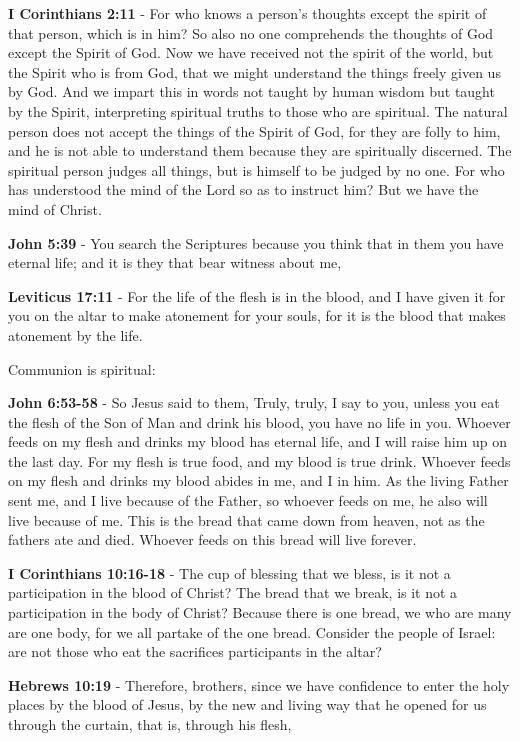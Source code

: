 \documentclass[11pt]{article}
\begin{document}
\textbf{I Corinthians 2:11} - For who knows a person's thoughts except the spirit of that person, which is in him? So also no one comprehends the thoughts of God except the Spirit of God. Now we have received not the spirit of the world, but the Spirit who is from God, that we might understand the things freely given us by God. And we impart this in words not taught by human wisdom but taught by the Spirit, interpreting spiritual truths to those who are spiritual. The natural person does not accept the things of the Spirit of God, for they are folly to him, and he is not able to understand them because they are spiritually discerned. The spiritual person judges all things, but is himself to be judged by no one. For who has understood the mind of the Lord so as to instruct him? But we have the mind of Christ.

\textbf{John 5:39} - You search the Scriptures because you think that in them you have eternal life; and it is they that bear witness about me,

\textbf{Leviticus 17:11} - For the life of the flesh is in the blood, and I have given it for you on the altar to make atonement for your souls, for it is the blood that makes atonement by the life.

Communion is spiritual:

\textbf{John 6:53-58} - So Jesus said to them, Truly, truly, I say to you, unless you eat the flesh of the Son of Man and drink his blood, you have no life in you.  Whoever feeds on my flesh and drinks my blood has eternal life, and I will raise him up on the last day.  For my flesh is true food, and my blood is true drink.  Whoever feeds on my flesh and drinks my blood abides in me, and I in him.  As the living Father sent me, and I live because of the Father, so whoever feeds on me, he also will live because of me.  This is the bread that came down from heaven, not as the fathers ate and died. Whoever feeds on this bread will live forever.

\textbf{I Corinthians 10:16-18} - The cup of blessing that we bless, is it not a participation in the blood of Christ? The bread that we break, is it not a participation in the body of Christ? Because there is one bread, we who are many are one body, for we all partake of the one bread. Consider the people of Israel: are not those who eat the sacrifices participants in the altar?

\textbf{Hebrews 10:19} - Therefore, brothers, since we have confidence to enter the holy places by the blood of Jesus, by the new and living way that he opened for us through the curtain, that is, through his flesh,
\end{document}
